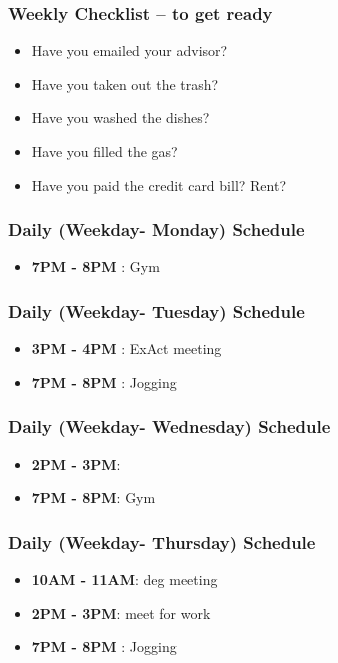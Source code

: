 \begin{frame} 
\frametitle{Weekly Checklist -- to get ready} 
\begin{itemize} 
\item Have you emailed your advisor? \\
\item Have you taken out the trash? \\
\item Have you washed the dishes? \\ 
\item Have you filled the gas? \\ 
\item Have you paid the credit card bill?  Rent? \\
\end{itemize} 
\end{frame}


\begin{frame} 
\frametitle{Daily (Weekday- Monday) Schedule} 
\begin{itemize} 
\item \textbf{7PM - 8PM} : Gym 
\end{itemize} 
\end{frame}

\begin{frame} 
\frametitle{Daily (Weekday- Tuesday) Schedule} 
\begin{itemize} 
\item \textbf{3PM - 4PM} : ExAct meeting 
\item \textbf{7PM - 8PM} : Jogging 
\end{itemize} 
\end{frame} 

\begin{frame} 
\frametitle{Daily (Weekday- Wednesday) Schedule} 
\begin{itemize} 
\item \textbf{2PM - 3PM}:
\item \textbf{7PM - 8PM}: Gym 
\end{itemize} 
\end{frame}

\begin{frame} 
\frametitle{Daily (Weekday- Thursday) Schedule} 
\begin{itemize}
\item \textbf{10AM - 11AM}: deg meeting  
\item \textbf{2PM - 3PM}: meet for work
\item \textbf{7PM - 8PM} : Jogging  
\end{itemize} 
\end{frame}

